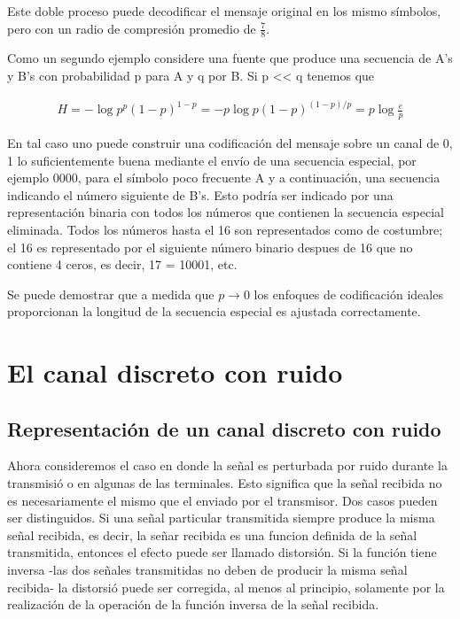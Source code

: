 Este doble proceso puede decodificar el mensaje original en los mismo s\'{i}mbolos, pero con un radio de compresi\'{o}n promedio de $\frac{7}{8}$.

Como un segundo ejemplo considere una fuente que produce una secuencia de A's y B's con probabilidad p para A y q por B. Si p << q tenemos que

\begin{equation}
\begin{array}{rcl}
H = - \log p^p (1 - p)^{1-p}
= -p \log p(1-p)^{(1-p)/p}
= p \log \frac{e}{p}
\end{array}
\end{equation}

En tal caso uno puede construir una codificaci\'{o}n del mensaje sobre
un canal de 0, 1 lo suficientemente buena mediante el env\'{i}o de una
secuencia especial, por ejemplo 0000, para el s\'{i}mbolo poco
frecuente A y a continuaci\'{o}n, una secuencia indicando el
n\'{u}mero siguiente de B's. Esto podr\'{i}a ser indicado por una
representaci\'{o}n binaria con todos los n\'{u}meros que contienen la
secuencia especial eliminada. Todos los n\'{u}meros hasta el 16 son
representados como de costumbre; el 16 es representado por el
siguiente n\'{u}mero binario despues de 16 que no contiene 4 ceros, es
decir, 17 = 10001, etc.

Se puede demostrar que a medida que $p\rightarrow{0}$ los enfoques de
codificaci\'{o}n ideales proporcionan la longitud de la secuencia
especial es ajustada correctamente.

\part{El canal discreto con ruido}
\label{part:2}

\chapter{Representaci\'{o}n de un canal discreto con ruido}
\label{sec:11}

Ahora consideremos el caso en donde la se\~{n}al es perturbada por
ruido durante la transmisi\'{o} o en algunas de las terminales. Esto
significa que la se\~{n}al recibida no es necesariamente el mismo que
el enviado por el transmisor. Dos casos pueden ser distinguidos. Si
una se\~{n}al particular transmitida siempre produce la misma
se\~{n}al recibida, es decir, la se\~{n}ar recibida es una funcion
definida de la se\~{n}al transmitida, entonces el efecto puede ser
llamado distorsi\'{o}n. Si la funci\'{o}n tiene inversa -las dos
se\~{n}ales transmitidas no deben de producir la misma se\~{n}al
recibida- la distorsi\'{o} puede ser corregida, al menos al principio,
solamente por la realizaci\'{o}n de la operaci\'{o}n de la funci\'{o}n
inversa de la se\~{n}al recibida.

